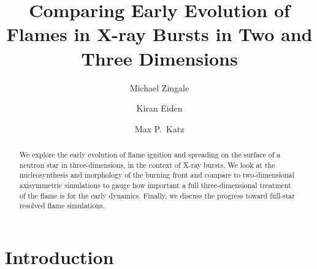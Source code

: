 \documentclass[twocolumn,times,tighten]{aastex631}
\begin{document}
\title{Comparing Early Evolution of Flames in X-ray Bursts in Two and Three Dimensions}


\author[0000-0001-8401-030X]{Michael Zingale}


\author[0000-0001-6191-4285]{Kiran Eiden}



\author[0000-0003-0439-4556]{Max P.\ Katz}




\begin{abstract}
We explore the early evolution of flame ignition and spreading on the
surface of a neutron star in three-dimensions, in the context of X-ray
bursts.  We look at the nucleosynthesis and morphology of the burning
front and compare to two-dimensional axisymmetric simulations to gauge
how important a full three-dimensional treatment of the flame is for
the early dynamics.  Finally, we discuss the progress toward full-star
resolved flame simulations.\end{abstract}


\section{Introduction}\label{Sec:Introduction}
\end{document}
